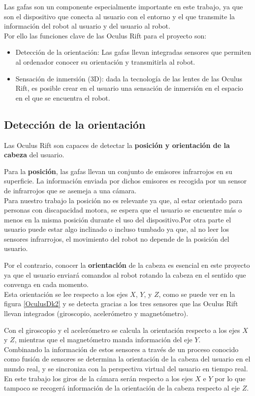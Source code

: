 \documentclass[twoside, 11pt]{epstfg}
\begin{document}
Las gafas son un componente especialmente importante en este trabajo, ya que son el dispositivo que conecta al usuario con el entorno y el que transmite la información del robot al usuario y del usuario al robot.\\
Por ello las funciones clave de las Oculus Rift para el proyecto son:
\begin{itemize}
	\item Detección de la orientación: Las gafas llevan integradas sensores que permiten al ordenador conocer su orientación y transmitirla al robot.
	\item Sensación de inmersión (3D): dada la tecnología de las lentes de las Oculus Rift, es posible crear en el usuario una sensación de inmersión en el espacio en el que se encuentra el robot.
\end{itemize}

\subsection{Detección de la orientación}


Las Oculus Rift son capaces de detectar la \textbf{posición y orientación de la cabeza} del usuario.

Para la \textbf{posición}, las gafas llevan un conjunto de emisores infrarrojos en su superficie. La información enviada por dichos emisores es recogida por un sensor de infrarrojos que se asemeja a una cámara.\\
Para nuestro trabajo la posición no es relevante ya que, al estar orientado para personas con discapacidad motora,  se espera que el usuario se encuentre más o menos en la misma posición durante el uso del dispositivo.Por otra parte el usuario puede estar algo inclinado o incluso tumbado ya que, al no leer los sensores infrarrojos, el movimiento del robot no depende de la posición del usuario.


Por el contrario, conocer la \textbf{orientación} de la cabeza es esencial en este proyecto ya que el usuario enviará comandos al robot rotando la cabeza en el sentido que convenga en cada momento.\\Esta orientación se lee respecto a los ejes $X$, $Y$, y $Z$, como se puede ver en la figura \ref{OculusDk2}  y se detecta gracias a los tres sensores que las Oculus Rift llevan integrados (giroscopio, acelerómetro y magnetómetro).


Con el giroscopio y el acelerómetro se calcula la orientación respecto a los ejes $X$ y $Z$, mientras que el magnetómetro manda información del eje $Y$.\\Combinando la información de estos sensores a través de un proceso conocido como fusión de sensores se determina la orientación de la cabeza del usuario en el mundo real, y se sincroniza con la perspectiva virtual del usuario en tiempo real.\\
En este trabajo los giros de la cámara serán respecto a los ejes $X$ e $Y$ por lo que tampoco se recogerá información de la orientación de la cabeza respecto al eje $Z$.
\end{document}
